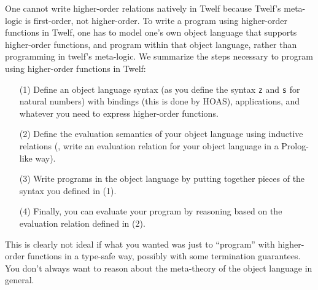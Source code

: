 One cannot write higher-order relations natively in Twelf
because Twelf's meta-logic is first-order, not higher-order.
To write a program using higher-order functions in Twelf, one has to model
one's own object language that supports higher-order functions, and program
within that object language, rather than programming in twelf's meta-logic.
We summarize the steps necessary to program using higher-order functions in Twelf:
\begin{itemize}
\item[(1)] Define an object language syntax
        (as you define the syntax \texttt{z} and \texttt{s} for natural numbers)
        with bindings (this is done by HOAS), applications, and whatever
        you need to express higher-order functions.
\item[(2)] Define the evaluation semantics of your object language using
        inductive relations (\ie, write an evaluation relation for
        your object language in a Prolog-like way).
\item[(3)] Write programs in the object language by putting
        together pieces of the syntax you defined in (1).
\item[(4)] Finally, you can evaluate your program by reasoning based on
        the evaluation relation defined in (2).
\end{itemize}
This is clearly not ideal if what you wanted was just to ``program''
with higher-order functions in a type-safe way, possibly with some
termination guarantees. You don't always want to reason about
the meta-theory of the object language in general.

